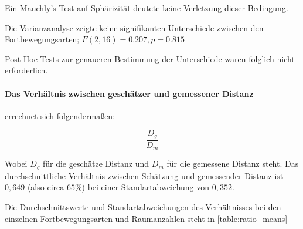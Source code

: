                     Ein Mauchly's Test auf Sphärizität deutete keine Verletzung dieser Bedingung.

                    Die Varianzanalyse zeigte keine signifikanten Unterschiede zwischen den Fortbewegungsarten; $F(2,16) = 0.207, p = 0.815$

                    Post-Hoc Tests zur genaueren Bestimmung der Unterschiede waren folglich nicht erforderlich.
%




%

                    \paragraph*{Das Verhältnis zwischen geschätzer und gemessener Distanz} errechnet sich folgendermaßen:

                    $$ \frac{D_g}{D_m} $$

                    Wobei $D_g$ für die geschätze Distanz und $D_m$ für die gemessene Distanz steht.
                    Das durchschnittliche Verhältnis zwischen Schätzung und gemessender Distanz ist $0,649$ (also circa $65\%$) bei einer Standartabweichung von $0,352$.

                    Die Durchschnittswerte und Standartabweichungen des Verhältnisses bei den einzelnen Fortbewegungsarten und Raumanzahlen steht in \autoref{table:ratio_means}


